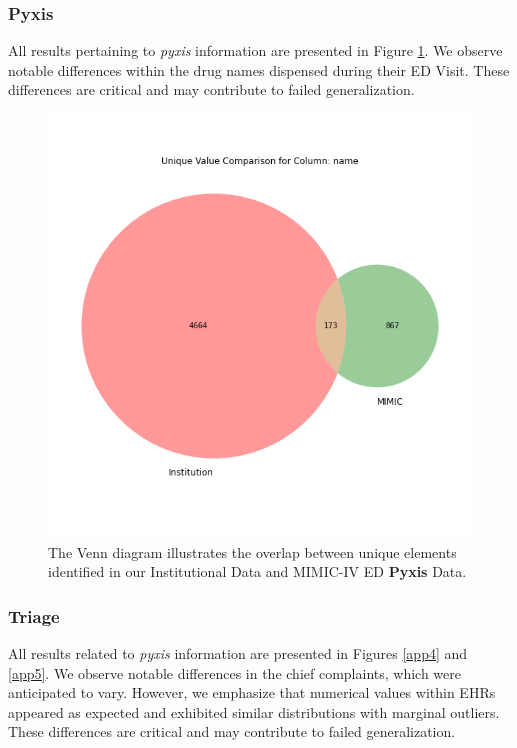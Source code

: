 \documentclass{article}
\theoremstyle{plain}
\theoremstyle{definition}
\theoremstyle{remark}
\begin{document}
 \subsubsection*{Pyxis}
 All results pertaining to \textit{pyxis} information are presented in Figure \ref{app3}. We observe notable differences within the drug names dispensed during their ED Visit. These differences are critical and may contribute to failed generalization.
 \begin{figure}[h!]
   \centering 
   \includegraphics[width=5in]{plots/name_venn.png} 
   \caption{The Venn diagram illustrates the overlap between unique elements identified in our Institutional Data and MIMIC-IV ED \textbf{Pyxis} Data.}
   \label{app3} 
 \end{figure} 

 \subsubsection*{Triage}
All results related to \textit{pyxis} information are presented in Figures \ref{app4} and \ref{app5}. We observe notable differences in the chief complaints, which were anticipated to vary. However, we emphasize that numerical values within EHRs appeared as expected and exhibited similar distributions with marginal outliers. These differences are critical and may contribute to failed generalization.
\end{document}
